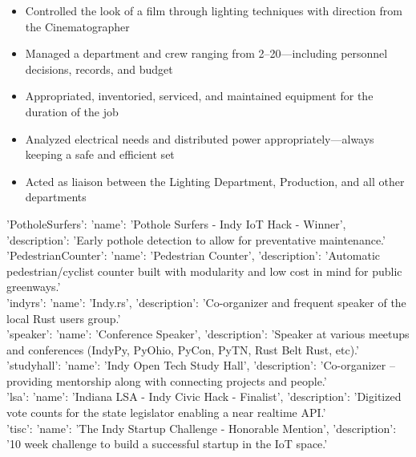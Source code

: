 \documentclass[letterpaper]{article}        %
\begin{document}
  \begin{itemize}
  
  \item Controlled the look of a film through lighting techniques with direction from the Cinematographer
  
  \item Managed a department and crew ranging from 2--20---including personnel decisions, records, and budget
  
  \item Appropriated, inventoried, serviced, and maintained equipment for the duration of the job
  
  \item Analyzed electrical needs and distributed power appropriately---always keeping a safe and efficient set
  
  \item Acted as liaison between the Lighting Department, Production, and all other departments
  
  \end{itemize}
  
  
  
  
  



  \begin{description}
    \item[{'PotholeSurfers': {'name': 'Pothole Surfers - Indy IoT Hack - Winner', 'description': 'Early pothole detection to allow for preventative maintenance.'}}] 
    \item[{'PedestrianCounter': {'name': 'Pedestrian Counter', 'description': 'Automatic pedestrian/cyclist counter built with modularity and low cost in mind for public greenways.'}}] 
    \item[{'indyrs': {'name': 'Indy.rs', 'description': 'Co-organizer and frequent speaker of the local Rust users group.'}}] 
    \item[{'speaker': {'name': 'Conference Speaker', 'description': 'Speaker at various meetups and conferences (IndyPy, PyOhio, PyCon, PyTN, Rust Belt Rust, etc).'}}] 
    \item[{'studyhall': {'name': 'Indy Open Tech Study Hall', 'description': 'Co-organizer -- providing mentorship along with connecting projects and people.'}}] 
    \item[{'lsa': {'name': 'Indiana LSA - Indy Civic Hack - Finalist', 'description': 'Digitized vote counts for the state legislator enabling a near realtime API.'}}] 
    \item[{'tisc': {'name': 'The Indy Startup Challenge - Honorable Mention', 'description': '10 week challenge to build a successful startup in the IoT space.'}}] 
    
  \end{description}
\end{document}
